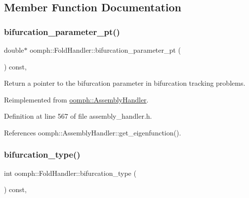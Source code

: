 \subsection{Member Function Documentation}
\mbox{\label{classoomph_1_1FoldHandler_a0e35268f1b13aa94739aaaaa366f4586}} 
\subsubsection{\texorpdfstring{bifurcation\+\_\+parameter\+\_\+pt()}{bifurcation\_parameter\_pt()}}
{\footnotesize\ttfamily double$\ast$ oomph\+::\+Fold\+Handler\+::bifurcation\+\_\+parameter\+\_\+pt (\begin{DoxyParamCaption}{ }\end{DoxyParamCaption}) const\hspace{0.3cm}{\ttfamily [inline]}, {\ttfamily [virtual]}}



Return a pointer to the bifurcation parameter in bifurcation tracking problems. 



Reimplemented from \hyperlink{classoomph_1_1AssemblyHandler_a3e369ec692c3d36a4a2a8a64dab7fe2b}{oomph\+::\+Assembly\+Handler}.



Definition at line 567 of file assembly\+\_\+handler.\+h.



References oomph\+::\+Assembly\+Handler\+::get\+\_\+eigenfunction().

\mbox{\label{classoomph_1_1FoldHandler_adb2878f53be92ea2be6cc012cbfc27ba}} 
\subsubsection{\texorpdfstring{bifurcation\+\_\+type()}{bifurcation\_type()}}
{\footnotesize\ttfamily int oomph\+::\+Fold\+Handler\+::bifurcation\+\_\+type (\begin{DoxyParamCaption}{ }\end{DoxyParamCaption}) const\hspace{0.3cm}{\ttfamily [inline]}, {\ttfamily [virtual]}}



